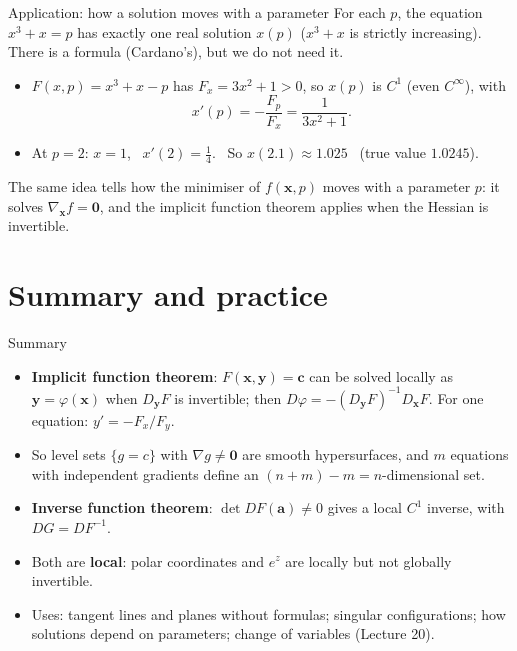 \documentclass[10pt]{wosm-slides}
\newcommand{\vx}{\mathbf{x}}
\newcommand{\vy}{\mathbf{y}}
\newcommand{\va}{\mathbf{a}}
\newcommand{\vc}{\mathbf{c}}
\begin{document}
\begin{frame}{Application: how a solution moves with a parameter}
  For each $p$, the equation $x^3 + x = p$ has exactly one real solution $x(p)$ ($x^3 + x$ is strictly
  increasing). There is a formula (Cardano's), but we do not need it.
  \pause
  \begin{itemize}
    \item $F(x, p) = x^3 + x - p$ has $F_x = 3x^2 + 1 > 0$, so $x(p)$ is $C^1$ (even $C^\infty$), with
      \[ x'(p) = -\frac{F_p}{F_x} = \frac{1}{3x^2 + 1} . \]
    \item At $p = 2$: $x = 1$, \ $x'(2) = \frac14$. \ So $x(2.1) \approx 1.025$ \ (true value $1.0245$).
  \end{itemize}
  \pause
  \begin{remark}
    The same idea tells how the minimiser of $f(\vx, p)$ moves with a parameter $p$: it solves
    $\nabla_{\vx} f = \mathbf 0$, and the implicit function theorem applies when the Hessian is
    invertible.
  \end{remark}
\end{frame}

\section{Summary and practice}

\begin{frame}{Summary}
  \begin{itemize}
    \item \textbf{Implicit function theorem}: $F(\vx, \vy) = \vc$ can be solved locally as
      $\vy = \varphi(\vx)$ when $D_{\vy}F$ is invertible; then $D\varphi = -(D_{\vy}F)^{-1} D_{\vx}F$.
      For one equation: $y' = -F_x / F_y$.
    \item So level sets $\{g = c\}$ with $\nabla g \ne \mathbf 0$ are smooth hypersurfaces, and $m$
      equations with independent gradients define an $(n + m) - m = n$-dimensional set.
    \item \textbf{Inverse function theorem}: $\det DF(\va) \ne 0$ gives a local $C^1$ inverse, with
      $DG = DF^{-1}$.
    \item Both are \textbf{local}: polar coordinates and $e^z$ are locally but not globally invertible.
    \item Uses: tangent lines and planes without formulas; singular configurations; how solutions
      depend on parameters; change of variables (Lecture 20).
  \end{itemize}
\end{frame}
\end{document}
